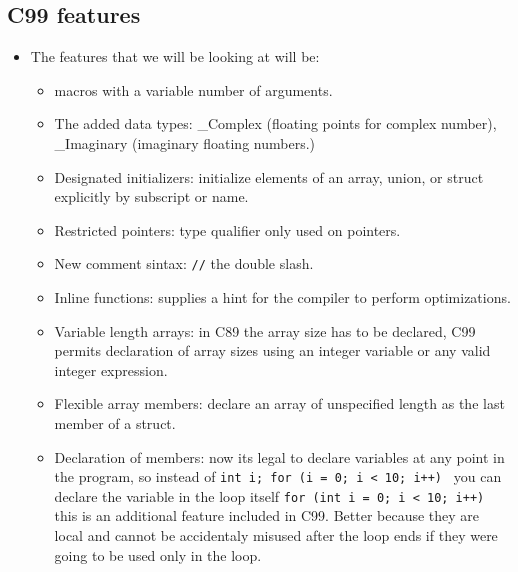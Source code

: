 \subsection{C99 features}
\begin{itemize}
    \item The features that we will be looking at will be:
        \begin{itemize}
            \item macros with a variable number of arguments.
            \item The added data types: \_Complex (floating points for complex number), \_Imaginary (imaginary floating numbers.)
            \item Designated initializers: initialize elements of an array, union, or struct explicitly by subscript or name.
            \item Restricted pointers: type qualifier only used on pointers.
            \item New comment sintax: \texttt{//} the double slash.
            \item Inline functions: supplies a hint for the compiler to perform optimizations.
            \item Variable length arrays: in C89 the array size has to be declared, C99 permits declaration of array sizes using an integer variable or any valid integer expression.
            \item Flexible array members: declare an array of unspecified length as the last member of a struct.
            \item Declaration of members: now its legal to declare variables at any point in the program, so instead of \texttt{int i; for (i = 0; i < 10; i++) {}} you can declare the variable in the loop itself \texttt{for (int i = 0; i < 10; i++) {}} this is an additional feature included in C99. Better because they are local and cannot be accidentaly misused after the loop ends if they were going to be used only in the loop.
        \end{itemize}
\end{itemize}


